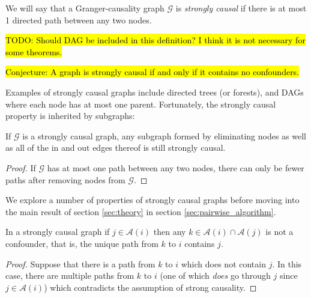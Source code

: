 \documentclass[12pt]{article}
\def\gcg{\mathcal{G}}  %
\newcommand{\anc}[1]{\mathcal{A}(#1)}  %
\begin{document}
\begin{definition}
  We will say that a Granger-causality graph $\gcg$ is \textit{strongly causal}
if there is at most 1 directed path between any two nodes.

\hl{TODO: Should DAG be included in this definition?  I think it is
  not necessary for some theorems.}
\end{definition}

\hl{Conjecture: A graph is strongly causal if and only if it contains
  no confounders.}

Examples of strongly causal graphs include directed trees (or
forests), and DAGs where each node has at most one parent.
Fortunately, the strongly causal property is inherited by subgraphs:

\begin{lemma}
  \label{lem:still_strongly_causal}
  If $\gcg$ is a strongly causal graph, any subgraph formed by eliminating nodes
  as well as all of the in and out edges thereof is still strongly causal.
\end{lemma}
\begin{proof}
  If $\gcg$ has at most one path between any two nodes, there can only
  be fewer paths after removing nodes from $\gcg$.
\end{proof}

We explore a number of properties of strongly causal graphs before
moving into the main result of section \ref{sec:theory} in section
\ref{sec:pairwise_algorithm}.

\begin{proposition}
  \label{prop:sc_graph_common_anc}
  In a strongly causal graph if $j \in \anc{i}$ then any
  $k \in \anc{i} \cap \anc{j}$ is not a confounder, that is,
  the unique path from $k$ to $i$ contains $j$.
\end{proposition}
\begin{proof}
  Suppose that there is a path from $k$ to $i$ which does not contain
  $j$.  In this case, there are multiple paths from $k$ to $i$ (one of
  which \textit{does} go through $j$ since $j \in \anc{i}$) which
  contradicts the assumption of strong causality.
\end{proof}

  
\end{document}

